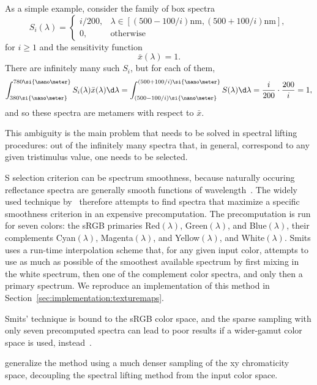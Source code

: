 As a simple example, consider the family of box spectra
\begin{equation*}
    S_i(\lambda) = \begin{cases}
        i / 200, &\lambda \in [ (500-100/i)\si{\nano\meter}, (500+100/i)\si{\nano\meter}],\\
        0, &\text{otherwise}
    \end{cases}
\end{equation*}
for $i \geq 1 $ and the sensitivity function
\begin{equation*}
    \bar x(\lambda) = 1.
\end{equation*}
There are infinitely many such $S_i$, but for each of them,
\begin{equation*}
    \int_{380\si{\nano\meter}}^{780\si{\nano\meter}} S_i(\lambda) \bar x(\lambda)\d\lambda
    = 
    \int_{(500-100/i)\si{\nano\meter}}^{(500+100/i)\si{\nano\meter}} S(\lambda)\d\lambda
    = \frac{i}{200} \cdot \frac{200}{i} = 1,
\end{equation*}
and so these spectra are metamers with respect to $\bar x$.

This ambiguity is the main problem that needs to be solved in spectral
lifting procedures: out of the infinitely many spectra that, in general,
correspond to any given tristimulus value, one needs to be selected.

S selection criterion can be spectrum smoothness, because naturally occuring
reflectance spectra are generally smooth functions of wavelength~\citep{maloney86}. 
The widely
used technique by~\citet{smits99} therefore attempts to find spectra that
maximize a specific smoothness criterion in an expensive precomputation.
The precomputation is run for seven colors: the sRGB primaries 
Red$(\lambda)$, Green$(\lambda)$, and Blue$(\lambda)$, 
their complements
Cyan$(\lambda)$, Magenta$(\lambda)$, and Yellow$(\lambda)$, and White$(\lambda)$. 
Smits uses a run-time interpolation scheme
that, for any given input color, attempts to use as much as possible 
of the smoothest available spectrum by first mixing in the white spectrum, 
then one of the complement color spectra, and only then a primary spectrum.
We reproduce an implementation of this method in Section~\ref{sec:implementation:texturemaps}.

Smits' technique is bound to the sRGB color space, and the sparse sampling with only
seven precomputed spectra can lead to poor results if a wider-gamut color space is
used, instead~\citep{meng2015}.

\citet{meng2015} generalize the method using a much denser sampling of the xy chromaticity
space, decoupling the spectral lifting method from the input color space.

